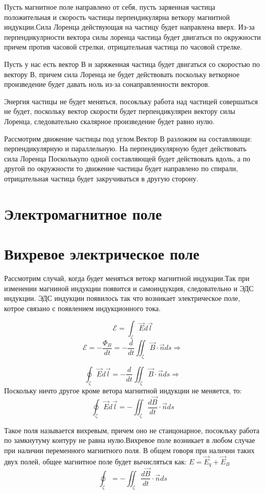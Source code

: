 \documentclass[../main.tex]{subfiles}
\begin{document}
Пусть магнитное поле направлено от себя, пусть заряенная частица положительная и скорость частицы перпендикулярна веткору магнитной индукции.Сила Лоренца действующая на частицу
будет направлена вверх. Из-за перпендикулрности вектора силы лоренца частица будет двигаться по окружности причем против часовой стрелки, отрицательная частица по часовой стрелке.

Пусть у нас есть вектор В и заряженная частица будет двигаться со скоростью по вектору В, причем сила Лоренца не будет действовать поскольку веткорное произведение будет давать ноль из-за сонаправленности векторов.

Энергия частицы не будет меняться, посокльку работа над частицей совершаться не будет, поскольку вектор скорости будет перпендикулярен вектору силы Лоренца, следовательно
скалярное произведение будет равно нулю.

Рассмотрим движение частицы под углом.Вектор В разложим на составляющи: перпендикулярную и параллельную. На перпендикулярную будет действовать сила Лоренца Посколькупо одной
составляющей будет действовать вдоль, а по другой по окружности то движение частицы будет направлено по спирали, отрицательная частица будет закручиваться в другую сторону.

\section{Электромагнитное поле}

\section{Вихревое электрическое поле}

Рассмотрим случай, когда будет меняться ветокр магнитной индукции.Так при изменении магниной индукции появится и самоиндукция, следовательно и ЭДС индукции.
ЭДС индукции появилось так что возникает электрическое поле, котрое связано с появлением индукционного тока.

\[\mathscr{E} = \int_{\zeta} \vec E d \vec l\]
\[\mathscr{E} = - \frac{\Phi_B}{dt} = -\frac{d}{dt} \iint_{\zeta} \vec B \cdot \vec n ds \Rightarrow\]

\[\oint_{\zeta} \vec E d \vec l = -\frac{d}{dt} \iint_{\zeta} \vec B \cdot \vec n ds \Rightarrow\]
Поскольку ничто другое кроме ветора магнитной индукции не меняется, то:
\[ \oint_{\zeta} \vec E d \vec l = - \iint_{\zeta} \frac{d \vec B}{dt} \cdot \vec n ds\]

Такое поля называется вихревым, причем оно не стаицонарное, посокльку работа по замкнутуму контуру не равна нулю.Вихревое поле возникает в любом случае при наличии переменного магнитного поля.
В общем говоря при наличии таких двух полей, общее магнитное поле будет вычисляться как: $E = \vec E _q + \vec E_B$
\[\oint_{\zeta} = - \iint_{\zeta} \frac{d \vec B}{dt} \cdot \vec n ds\]
\end{document}
